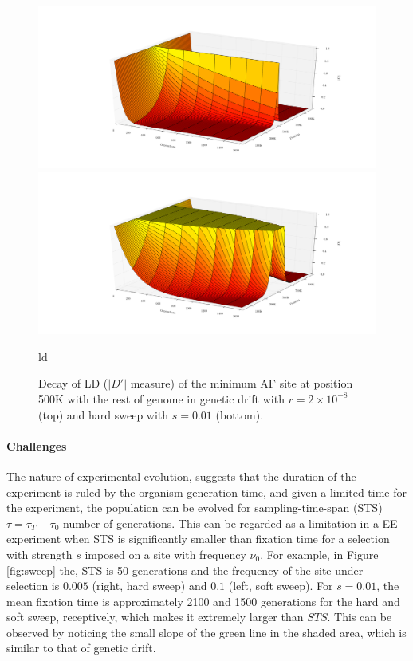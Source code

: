 \documentclass[11pt]{article}
\begin{document}
\begin{figure}
	\centering
	\includegraphics[width=\textwidth]{LDDecay3dNeutral}
	\includegraphics[width=\textwidth]{LDDecay3dSweep}
		\caption{ld} \label{fig:ld3d}
			\caption{Decay of LD ($|D'|$ measure) of the minimum AF site at 
			position 500K with the rest of genome in genetic drift with 
			$r=2\times10^{-8}$ (top) and hard sweep with $s=0.01$ (bottom).}
\end{figure}


\paragraph{Challenges}
The nature of experimental evolution, suggests that the duration of the 
experiment is ruled by the organism generation time, and given a limited time 
for the experiment, the population can be evolved for sampling-time-span (STS) 
$\tau=\tau_T-\tau_0$  number of generations. This can be regarded as a 
limitation in a EE experiment when STS is significantly smaller than fixation 
time for a selection with strength $s$ imposed on a site with frequency 
$\nu_0$. For example, in Figure \ref{fig:sweep} the, STS is 50 generations and 
the frequency of the site under selection is $0.005$ (right, hard sweep) and 
$0.1$ (left, soft sweep). 
For $s=0.01$, the mean fixation time is approximately 2100 and 1500 generations 
for the hard and soft sweep, receptively, which makes it extremely larger than 
$STS$. This can be observed by noticing the small slope of the green line in 
the shaded area, which is similar to that of genetic drift.
\end{document}

